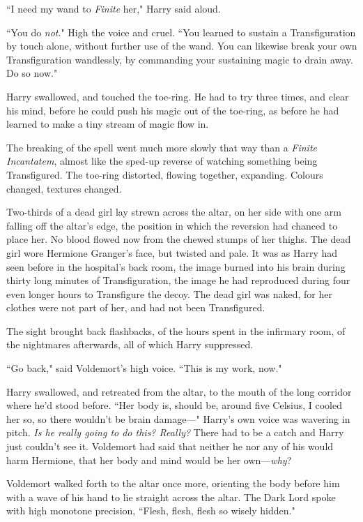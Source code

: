 ``I need my wand to \emph{Finite} her," Harry said aloud.

``You do \emph{not}." High the voice and cruel. ``You learned to sustain a Transfiguration by touch alone, without further use of the wand. You can likewise break your own Transfiguration wandlessly, by commanding your sustaining magic to drain away. Do so now."

Harry swallowed, and touched the toe-ring. He had to try three times, and clear his mind, before he could push his magic out of the toe-ring, as before he had learned to make a tiny stream of magic flow in.

The breaking of the spell went much more slowly that way than a \emph{Finite Incantatem}, almost like the sped-up reverse of watching something being Transfigured. The toe-ring distorted, flowing together, expanding. Colours changed, textures changed.

Two-thirds of a dead girl lay strewn across the altar, on her side with one arm falling off the altar's edge, the position in which the reversion had chanced to place her. No blood flowed now from the chewed stumps of her thighs. The dead girl wore Hermione Granger's face, but twisted and pale. It was as Harry had seen before in the hospital's back room, the image burned into his brain during thirty long minutes of Transfiguration, the image he had reproduced during four even longer hours to Transfigure the decoy. The dead girl was naked, for her clothes were not part of her, and had not been Transfigured.

The sight brought back flashbacks, of the hours spent in the infirmary room, of the nightmares afterwards, all of which Harry suppressed.

``Go back," said Voldemort's high voice. ``This is my work, now."

Harry swallowed, and retreated from the altar, to the mouth of the long corridor where he'd stood before. ``Her body is, should be, around five Celsius, I cooled her so, so there wouldn't be brain damage—" Harry's own voice was wavering in pitch. \emph{Is he really going to do this? Really?} There had to be a catch and Harry just couldn't see it. Voldemort had said that neither he nor any of his would harm Hermione, that her body and mind would be her own—\emph{why}?

Voldemort walked forth to the altar once more, orienting the body before him with a wave of his hand to lie straight across the altar. The Dark Lord spoke with high monotone precision, ``Flesh, flesh, flesh so wisely hidden."

